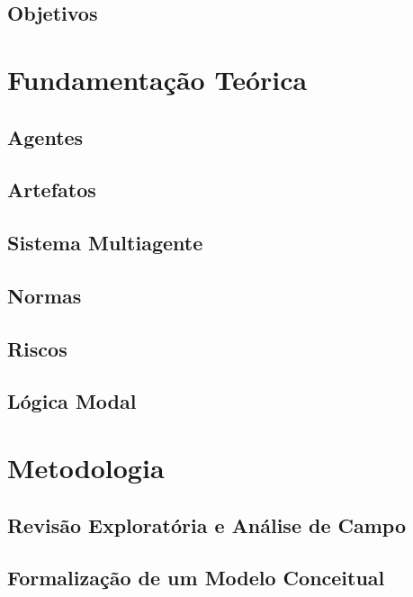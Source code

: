 \documentclass[openright]{normas-utf-tex} %
\begin{document}
	\section{Objetivos} \label{goals}
		
\chapter{Fundamentação Teórica}
\label{chap:fundteoric}
	
	\section{Agentes} \label{agent}
		
	\section{Artefatos} \label{artefact}
		
	\section{Sistema Multiagente} \label{sma}
		
	\section{Normas} \label{normasdastani}
		
	\section{Riscos} \label{risksec}
				
	\section{Lógica Modal} \label{logic}
		
\chapter{Metodologia}
\label{chap:metod}
	
    \section{Revisão Exploratória e Análise de Campo} 
          
    \section{Formalização de um Modelo Conceitual} 
         
\end{document}
